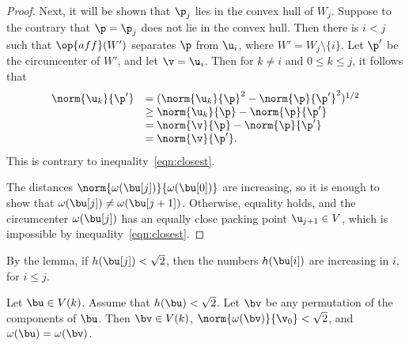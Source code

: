 \begin{proof}
%
 Next, it will be shown that $\p_j$ lies in the
convex hull of $W_j$.
Suppose to the contrary that $\p=\p_j$ does not lie in the convex
hull. Then there is $i<j$ such that $\op{aff}(W')$ separates $\p$ from
$ \u_i$, where $W'=W_j\setminus\{i\}$.  Let $\p'$ be the circumcenter
of $W'$, and let $\v= \u_i$.  Then for $k\ne i$ and $0\le k\le j$, it
follows that
\begin{displaymath}
\begin{array}{lll}
\norm{ \u_k}{\p'} &= (\norm{ \u_k}{\p}^2 - \norm{\p}{\p'}^2)^{1/2} \\
&\ge \norm{ \u_k}{\p} - \norm{\p}{\p'} \\
&=\norm{\v}{\p} - \norm{\p}{\p'}\\
&=\norm{\v}{\p'}.
\end{array}
\end{displaymath}
This is contrary to inequality~\ref{eqn:closest}.


 The distances
$\norm{\omega(\bu[j])}{\omega(\bu[0])}$ are increasing, so it is
enough to show that $\omega(\bu[j])\ne \omega(\bu[j+1])$.  Otherwise,
equality holds, and the circumcenter $\omega(\bu[j])$ has an equally
close packing point $ \u_{j+1}\in V$, which is impossible by
inequality~\ref{eqn:closest}.
\end{proof}





By the lemma, if $h(\bu[j])<\sqrt2$, then the numbers $h(\bu[i])$ are
increasing in $i$, for $i\le j$.


\begin{lemma}   
Let $\bu\in V(k)$.  Assume that $h(\bu)<\sqrt2$. Let $\bv$ be any
permutation of the components of $\bu$.  Then $\bv\in V(k)$,
$\norm{\omega(\bv)}{\v_0}<\sqrt2$, and $\omega(\bu) = \omega(\bv)$.
\end{lemma}

